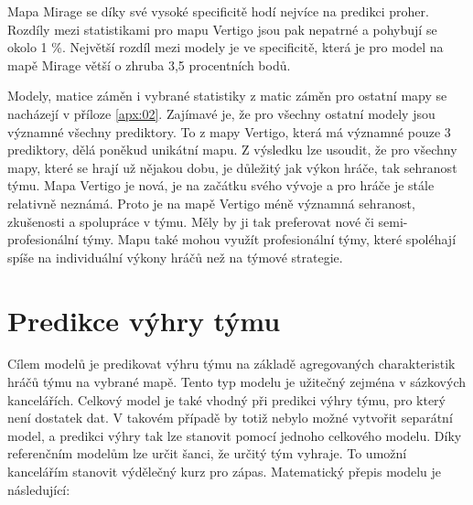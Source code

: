 

Mapa Mirage se  díky své vysoké specificitě hodí nejvíce na predikci proher. Rozdíly mezi statistikami pro mapu Vertigo jsou pak nepatrné a pohybují se okolo 1 \%.
Největší rozdíl mezi modely je ve specificitě, která je pro model na mapě Mirage větší o zhruba 3,5 procentních bodů.

Modely, matice záměn i vybrané statistiky z matic záměn pro ostatní mapy se nacházejí v příloze \ref{apx:02}. Zajímavé je, že pro všechny ostatní modely
jsou významné všechny prediktory. To z mapy Vertigo, která má významné pouze 3 prediktory, dělá poněkud unikátní mapu. Z výsledku lze usoudit, že
pro všechny mapy, které se hrají už nějakou dobu, je důležitý jak výkon hráče, tak sehranost týmu. Mapa Vertigo je nová, je na začátku svého
vývoje a pro hráče je stále relativně neznámá. Proto je na mapě Vertigo méně významná sehranost, zkušenosti a spolupráce v týmu. Měly by ji tak preferovat
nové či semi-profesionální týmy. Mapu také mohou využít profesionální týmy, které spoléhají spíše na individuální výkony hráčů než na týmové strategie.

\newpage
\section{Predikce výhry týmu}
Cílem modelů je predikovat výhru týmu na základě agregovaných charakteristik hráčů týmu na vybrané mapě. Tento typ modelu je užitečný zejména v sázkových kancelářích.
Celkový model je také vhodný při predikci výhry týmu, pro který není dostatek dat. V takovém případě by totiž nebylo možné vytvořit separátní model, a predikci výhry tak
lze stanovit pomocí jednoho celkového modelu. Díky referenčním modelům lze určit šanci, že určitý tým vyhraje. To umožní kancelářím stanovit výdělečný kurz pro zápas.
Matematický přepis modelu je následující:

